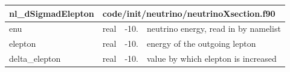 \documentclass{article}
\begin{document}
\begin{longtable}{llll}
\toprule
\textbf{\large{nl\_dSigmadElepton}} & \multicolumn{3}{l}{\footnotesize{code/init/neutrino/neutrinoXsection.f90}}\\*
\midrule
\endfirsthead
\midrule
\endhead
enu & \begin{minipage}[t]{2cm}real\end{minipage} & \begin{minipage}[t]{2cm}-10.\end{minipage} & \begin{minipage}[t]{12cm}neutrino energy, read in by namelist\end{minipage}\\*
\midrule
elepton & \begin{minipage}[t]{2cm}real\end{minipage} & \begin{minipage}[t]{2cm}-10.\end{minipage} & \begin{minipage}[t]{12cm}energy of the outgoing lepton\end{minipage}\\*
\midrule
delta\_elepton & \begin{minipage}[t]{2cm}real\end{minipage} & \begin{minipage}[t]{2cm}-10.\end{minipage} & \begin{minipage}[t]{12cm}value by which elepton is increased\end{minipage}\\*
\bottomrule
\end{longtable}
{ }



\end{document}
